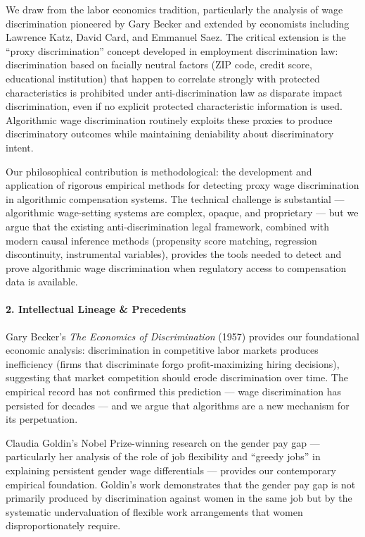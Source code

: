 We draw from the labor economics tradition, particularly the analysis of
wage discrimination pioneered by Gary Becker and extended by economists
including Lawrence Katz, David Card, and Emmanuel Saez. The critical
extension is the ``proxy discrimination'' concept developed in
employment discrimination law: discrimination based on facially neutral
factors (ZIP code, credit score, educational institution) that happen to
correlate strongly with protected characteristics is prohibited under
anti-discrimination law as disparate impact discrimination, even if no
explicit protected characteristic information is used. Algorithmic wage
discrimination routinely exploits these proxies to produce
discriminatory outcomes while maintaining deniability about
discriminatory intent.

Our philosophical contribution is methodological: the development and
application of rigorous empirical methods for detecting proxy wage
discrimination in algorithmic compensation systems. The technical
challenge is substantial --- algorithmic wage-setting systems are
complex, opaque, and proprietary --- but we argue that the existing
anti-discrimination legal framework, combined with modern causal
inference methods (propensity score matching, regression discontinuity,
instrumental variables), provides the tools needed to detect and prove
algorithmic wage discrimination when regulatory access to compensation
data is available.

\paragraph{2. Intellectual Lineage \&
Precedents}\label{intellectual-lineage-precedents-42}

Gary Becker's \emph{The Economics of Discrimination} (1957) provides our
foundational economic analysis: discrimination in competitive labor
markets produces inefficiency (firms that discriminate forgo
profit-maximizing hiring decisions), suggesting that market competition
should erode discrimination over time. The empirical record has not
confirmed this prediction --- wage discrimination has persisted for
decades --- and we argue that algorithms are a new mechanism for its
perpetuation.

Claudia Goldin's Nobel Prize-winning research on the gender pay gap ---
particularly her analysis of the role of job flexibility and ``greedy
jobs'' in explaining persistent gender wage differentials --- provides
our contemporary empirical foundation. Goldin's work demonstrates that
the gender pay gap is not primarily produced by discrimination against
women in the same job but by the systematic undervaluation of flexible
work arrangements that women disproportionately require.

